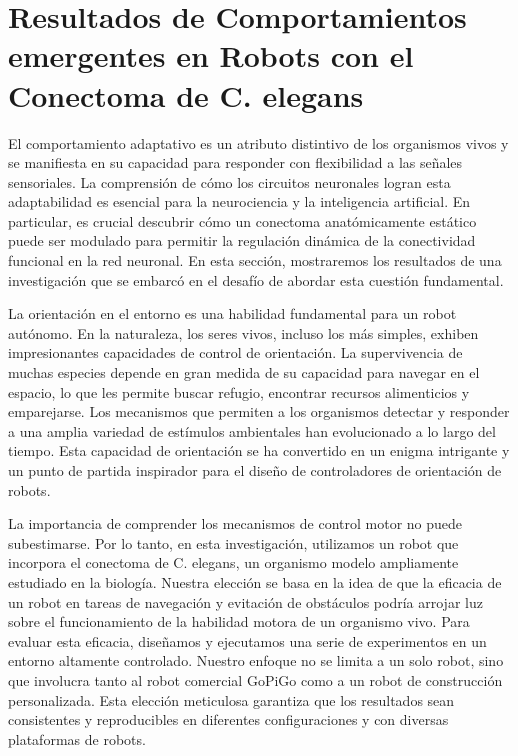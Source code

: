 \chapter{Resultados de Comportamientos emergentes en Robots con el  Conectoma de C. elegans}\label{cap:resultados_robot}
\graphicspath{{figs/capitulo_resultados_robot/}}



El comportamiento adaptativo es un atributo distintivo de los organismos vivos y se manifiesta en su capacidad para responder con flexibilidad a las señales sensoriales. La comprensión de cómo los circuitos neuronales logran esta adaptabilidad es esencial para la neurociencia y la inteligencia artificial. En particular, es crucial descubrir cómo un conectoma anatómicamente estático puede ser modulado para permitir la regulación dinámica de la conectividad funcional en la red neuronal. En esta sección, mostraremos los resultados de  una investigación que se embarcó en el desafío de abordar esta cuestión fundamental.

La orientación en el entorno es una habilidad fundamental para un robot autónomo. En la naturaleza, los seres vivos, incluso los más simples, exhiben impresionantes capacidades de control de orientación. La supervivencia de muchas especies depende en gran medida de su capacidad para navegar en el espacio, lo que les permite buscar refugio, encontrar recursos alimenticios y emparejarse. Los mecanismos que permiten a los organismos detectar y responder a una amplia variedad de estímulos ambientales han evolucionado a lo largo del tiempo. Esta capacidad de orientación se ha convertido en un enigma intrigante y un punto de partida inspirador para el diseño de controladores de orientación de robots.

La importancia de comprender los mecanismos de control motor no puede subestimarse. Por lo tanto, en esta investigación, utilizamos un robot que incorpora el conectoma de C. elegans, un organismo modelo ampliamente estudiado en la biología. Nuestra elección se basa en la idea de que la eficacia de un robot en tareas de navegación y evitación de obstáculos podría arrojar luz sobre el funcionamiento de la habilidad motora de un organismo vivo. Para evaluar esta eficacia, diseñamos y ejecutamos una serie de experimentos en un entorno altamente controlado. Nuestro enfoque no se limita a un solo robot, sino que involucra tanto al robot comercial GoPiGo como a un robot de construcción personalizada. Esta elección meticulosa garantiza que los resultados sean consistentes y reproducibles en diferentes configuraciones y con diversas plataformas de robots.

